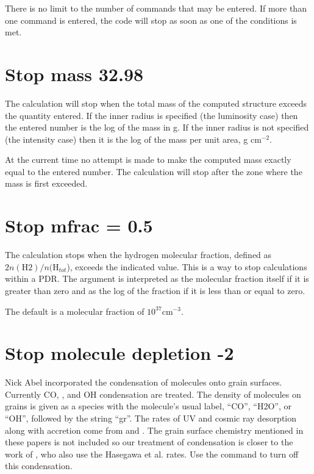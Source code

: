 There is no limit to the number of  commands that may be entered.
If more than one
 command is entered, the code
will stop as soon as one of the conditions is met.

\section{Stop mass 32.98}

The calculation will stop when the total mass of the computed structure
exceeds the quantity entered.  If the inner radius is specified (the
luminosity case) then the entered number is the log of the mass in g.
If the inner radius is not specified (the intensity case) then it is the
log of the mass per unit area, g cm$^{-2}$.

At the current time no attempt is made to make the computed mass exactly
equal to the entered number.
The calculation will stop after the zone where
the mass is first exceeded.

\section{Stop mfrac = 0.5}

The calculation stops when the hydrogen molecular fraction, defined as
$2n(\mathrm{H}2)/n(\mathrm{H}_{tot}$), exceeds the indicated value.
This is a way to stop
calculations within a PDR.
The argument is interpreted as the molecular
fraction itself if it is greater than zero and as the log of the fraction
if it is less than or equal to zero.

The default is a molecular fraction of $10^{37} \mathrm{cm}^{-3}$.

\section{Stop molecule depletion -2}

Nick Abel incorporated the condensation of molecules onto grain surfaces.
Currently CO, \water, and OH condensation are treated.
The density of molecules
on grains is given as a species with the molecule's usual label, ``CO'',
``H2O'', or ``OH'', followed by the string ``gr''.
The rates of UV and
cosmic ray desorption along with accretion come from \citet{Hasegawa1992} and \citet{Hasegawa1993}.
The grain surface chemistry
mentioned in these papers is not included so our treatment of condensation
is closer to the work of \citet{Bergin1995}, who also use
the Hasegawa et al. rates.
Use the  command
to turn off this condensation.

